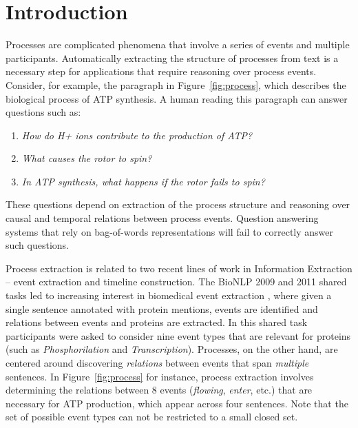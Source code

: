 \section{Introduction}

Processes are complicated phenomena that involve a series of events and multiple participants. Automatically extracting the structure of processes from text is a necessary step for applications that require reasoning over process events. Consider, for example, the paragraph in Figure~\ref{fig:process}, which describes the biological process of ATP synthesis. A human reading this paragraph can answer questions such as:

\begin{enumerate}[itemsep=0pt,topsep=0pt] 
\item \small \emph{How do H+ ions contribute to the production of ATP?}
\item \small\emph{What causes the rotor to spin?}
\item \small \emph{In ATP synthesis, what happens if the rotor fails to spin?}
\end{enumerate}

\noindent These questions depend on extraction of the process structure and reasoning over causal and temporal relations between process events. Question answering systems that rely on bag-of-words representations will fail to correctly answer such questions.


Process extraction is related to two recent lines of work in Information Extraction -- event extraction and timeline construction. The BioNLP 2009 and 2011 shared tasks \cite{kim09,kim11} led to increasing interest in biomedical event extraction \cite{Poon10,Miwa10,riedel11fast,Mcclosky11,Bjorne11}, where given a single sentence annotated with protein mentions, events are identified and relations between events and proteins are extracted. In this shared task participants were asked to consider nine event types that are relevant for proteins (such as \emph{Phosphorilation} and \emph{Transcription}). Processes, on the other hand,  are centered around discovering \emph{relations} between events that span \emph{multiple} sentences. In Figure~\ref{fig:process} for instance, process extraction involves determining the relations between 8 events (\emph{flowing}, \emph{enter}, etc.) that are necessary for ATP production, which appear across four sentences. Note that the set of possible event types can not be restricted to a small closed set.

